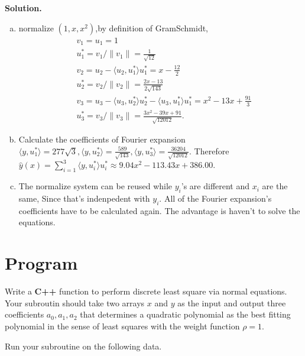 \documentclass[a4paper]{book}
\newenvironment{solution}%
{\noindent\textbf{Solution.}}%
{\qedhere}
\numberwithin{equation}{chapter}
\theoremstyle{definition}
\begin{document}
\begin{solution}
  \begin{enumerate}[(a)]
  \item normalize $(1,x,x^2)$,by definition of GramSchmidt,
    \begin{align*}
      &v_1 = u_1 = 1 \\
      &u_1^* = v_1/ \lVert v_1 \rVert = \frac{1}{\sqrt{12}} \\
      &v_2 = u_2 - \langle u_2,u_1^* \rangle u_1^* = x - \frac{12}{2} \\
      &u_2^* = v_2 / \lVert v_2 \rVert = \frac{2x -13}{2\sqrt{143}} \\
      &v_3 = u_3 - \langle u_3, u_2^* \rangle u_2^* - \langle u_3,u_1^* \rangle u_1^* = x^2 - 13x + \frac{91}{3} \\
      &u_3^* = v_3/ \lVert v_3 \rVert = \frac{3x^2 - 39x + 91}{\sqrt{12012}}.
    \end{align*}

  \item Calculate the coefficients of Fourier expansion $  \langle y, u_1^* \rangle = 277\sqrt{3}, \langle y, u_2^* \rangle = \frac{589}{\sqrt{143}}, \langle y, u_3^* \rangle = \frac{36204}{\sqrt{12012}}$. Therefore $\hat{y}(x) = \sum_{i = 1}^3 \langle y,u_i^* \rangle u_i^* \approx 9.04 x^2 - 113.43x + 386.00$.

    \item The normalize system can be reused while $y_i$'s are different and $x_i$ are the same, Since that's indenpedent with $y_i$. All of the Fourier expansion's coefficients have to be calculated again. The advantage is haven't to solve the equations.
  \end{enumerate}
\end{solution}


\section{Program}

Write a \textbf{C++} function to perform discrete least square via normal equations. Your subroutin should take two arrays $x$ and $y$ as the input and output three coefficients $a_0,a_1,a_2$ that determines a quadratic polynomial as the best fitting polynomial in the sense of least squares with the weight function $\rho = 1$.

Run your subroutine on the following data.
\end{document}
